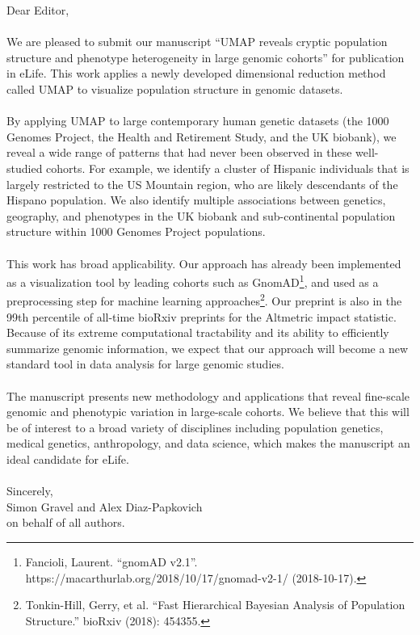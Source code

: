 \documentclass{article}
\begin{document}
Dear Editor,
\\\\
We are pleased to submit our manuscript ``UMAP reveals cryptic population structure and phenotype heterogeneity in large genomic cohorts'' for publication in eLife. This work applies a newly developed dimensional reduction method called UMAP to visualize population structure in genomic datasets.
\\\\
By applying UMAP to large contemporary human genetic datasets (the 1000 Genomes Project, the Health and Retirement Study, and the UK biobank), we reveal a wide range of patterns that had never been observed in these well-studied cohorts. For example, we identify a cluster of Hispanic individuals that is largely restricted to the US Mountain region, who are likely descendants of the Hispano population. We also identify multiple associations between genetics, geography, and phenotypes in the UK biobank and sub-continental population structure within 1000 Genomes Project populations.
\\\\
This work has broad applicability. Our approach has already been implemented as a visualization tool by leading cohorts such as GnomAD\footnote{Fancioli, Laurent. ``gnomAD v2.1''. https://macarthurlab.org/2018/10/17/gnomad-v2-1/ (2018-10-17).}, and used as a preprocessing step for machine learning approaches\footnote{Tonkin-Hill, Gerry, et al. ``Fast Hierarchical Bayesian Analysis of Population Structure.'' bioRxiv (2018): 454355.}. Our preprint is also in the 99th percentile of all-time bioRxiv preprints for the Altmetric impact statistic. Because of its extreme computational tractability and its ability to efficiently summarize genomic information, we expect that our approach will become a new standard tool in data analysis for large genomic studies. 
\\\\
The manuscript presents new methodology and applications that reveal fine-scale genomic and phenotypic variation in large-scale cohorts.  We believe that this will be of interest to a broad variety of disciplines including population genetics, medical genetics, anthropology, and data science, which makes the manuscript an ideal candidate for eLife.
\\
\\
Sincerely,
\\
Simon Gravel and Alex Diaz-Papkovich
\\
on behalf of all authors.
\end{document}
